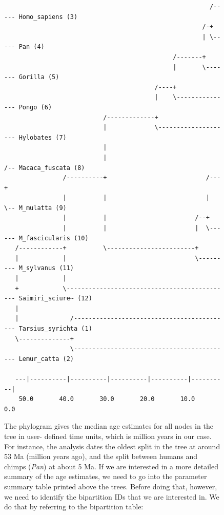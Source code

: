 \documentclass[12pt]{book}
\begin{document}
\begin{figure}[h]
\scriptsize
\begin{singlespacing}
\begin{verbatim}
                                                        /----- Homo_sapiens (3)
                                                      /-+                          
                                                      | \----- Pan (4)
                                              /-------+                            
                                              |       \------- Gorilla (5)
                                         /----+                                    
                                         |    \--------------- Pongo (6)
                           /-------------+                                         
                           |             \-------------------- Hylobates (7)
                           |                                                       
                           |                               /-- Macaca_fuscata (8)
                /----------+                           /---+                       
                |          |                           |   \-- M_mulatta (9)
                |          |                        /--+                           
                |          |                        |  \------ M_fascicularis (10)
   /------------+          \------------------------+                              
   |            |                                   \--------- M_sylvanus (11)
   |            |                                                                  
   +            \--------------------------------------------- Saimiri_sciure~ (12)
   |                                                                               
   |              /------------------------------------------- Tarsius_syrichta (1)
   \--------------+                                                                
                  \------------------------------------------- Lemur_catta (2)
                                                                                   
   ---|----------|----------|----------|----------|----------|                     
    50.0       40.0       30.0       20.0       10.0        0.0                    
\end{verbatim}
\end{singlespacing}
\normalsize

The phylogram gives the median age estimates for all nodes in the tree in user- defined time units,
which is million years in our case. For instance, the analysis dates the oldest split in the tree
at around 53 Ma (million years ago), and the split between humans and chimps (\textit{Pan}) at
about 5 Ma. If we are interested in a more detailed summary of the age estimates, we need to go
into the parameter summary table printed above the trees. Before doing that, however, we need to
identify the bipartition IDs that we are interested in. We do that by referring to the bipartition
table:


\end{figure}
\end{document}
